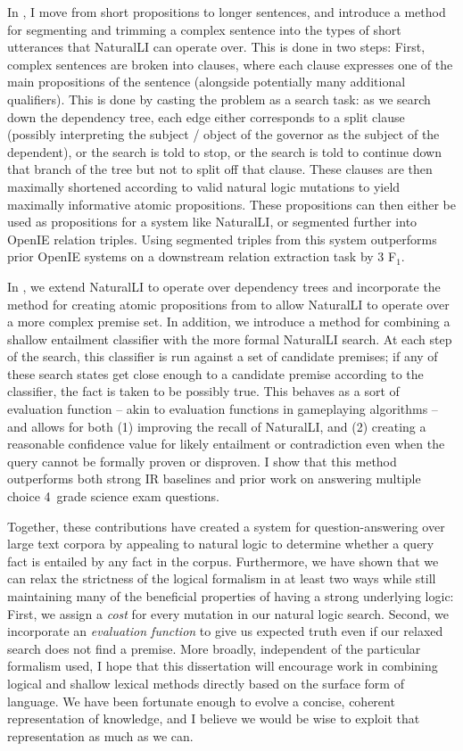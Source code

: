 In , I move from short propositions to longer sentences, and introduce a method for
  segmenting and trimming a complex sentence into the types of short utterances that NaturalLI can
  operate over.
This is done in two steps: First, complex sentences are broken into clauses, where each clause
  expresses one of the main propositions of the sentence (alongside potentially many additional
  qualifiers).
This is done by casting the problem as a search task: as we search down the dependency tree, each
  edge either corresponds to a split clause (possibly interpreting the subject / object of the
  governor as the subject of the dependent), or the search is told to stop, or the search is told
  to continue down that branch of the tree but not to split off that clause.
These clauses are then maximally shortened according to valid natural logic mutations to yield
  maximally informative atomic propositions.
These propositions can then either be used as propositions for a system like NaturalLI, or segmented
  further into OpenIE relation triples.
Using segmented triples from this system outperforms prior OpenIE systems on a downstream relation
  extraction task by 3 F$_1$.

In , we extend NaturalLI to operate over dependency trees and incorporate the method for
  creating atomic propositions from  to allow NaturalLI to operate over a more complex
  premise set.
In addition, we introduce a method for combining a shallow entailment classifier with the more formal
  NaturalLI search.
At each step of the search, this classifier is run against a set of candidate premises; if any of these
  search states get close enough to a candidate premise according to the classifier, the fact is taken
  to be possibly true.
This behaves as a sort of evaluation function -- akin to evaluation functions in gameplaying algorithms --
  and allows for both (1) improving the recall of NaturalLI, and (2) creating a reasonable confidence
  value for likely entailment or contradiction even when the query cannot be formally proven or disproven.
I show that this method outperforms both strong IR baselines and prior work on answering multiple choice
  4\nth\ grade science exam questions.

Together, these contributions have created a system for question-answering over large text corpora by appealing
  to natural logic to determine whether a query fact is entailed by any fact in the corpus.
Furthermore, we have shown that we can relax the strictness of the logical formalism in at least two ways
  while still maintaining many of the beneficial properties of having a strong underlying logic:
First, we assign a \textit{cost} for every mutation in our natural logic search.
Second, we incorporate an \textit{evaluation function} to give us expected truth even if our relaxed search
  does not find a premise.
More broadly, independent of the particular formalism used, I hope that this dissertation will encourage work
  in combining logical and shallow lexical methods directly based on the surface form of language.
We have been fortunate enough to evolve a concise, coherent representation of knowledge, and I believe we
  would be wise to exploit that representation as much as we can.

